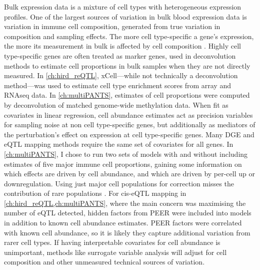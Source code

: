 Bulk expression data is a mixture of cell types with heterogeneous expression profiles.
One of the largest sources of variation in bulk blood expression data is variation in immune cell composition, generated from true variation in composition and sampling effects.
The more cell type-specific a gene's expression, the more its measurement in bulk is affected by cell composition \autocite{farahbod2020UntanglingEffectsCellular}.
Highly cell type-specific genes are often treated as marker genes, 
used in deconvolution methods to estimate cell proportions in bulk samples when they are not directly measured.
In \cref{ch:hird_reQTL}, xCell---while not technically a deconvolution method---was used to estimate cell type enrichment scores from array and \gls{RNAseq} data.
In \cref{ch:multiPANTS}, estimates of cell proportions were computed by deconvolution of matched genome-wide methylation data.
When fit as covariates in linear regression, 
cell abundance estimates act as precision variables for sampling noise at non cell type-specific genes, 
but additionally as mediators of the perturbation's effect on expression at cell type-specific genes.
Many \gls{DGE} and \gls{eQTL} mapping methods require the same set of covariates for all genes.
In \cref{ch:multiPANTS}, I chose to run two sets of models with and without including estimates of five major immune cell proportions,
gaining some information on which effects are driven by cell abundance, and which are driven by per-cell up or downregulation.
Using just major cell populations for correction misses the contribution of rare populations \autocite{pellegrinocoppola2020CorrectionBothCommon}.
For cis-\gls{eQTL} mapping in \cref{ch:hird_reQTL,ch:multiPANTS}, where the main concern was maximising the number of \gls{eQTL} detected,
hidden factors from PEER were included into models in addition to known cell abundance estimates.
PEER factors were correlated with known cell abundance, so it is likely they capture additional variation from rarer cell types.
If having interpretable covariates for cell abundance is unimportant,
methods like surrogate variable analysis \autocite{leek2014SvaseqRemovingBatch,liu2016EvaluationMethodsRemoving}
will adjust for cell composition and other unmeasured technical sources of variation.

